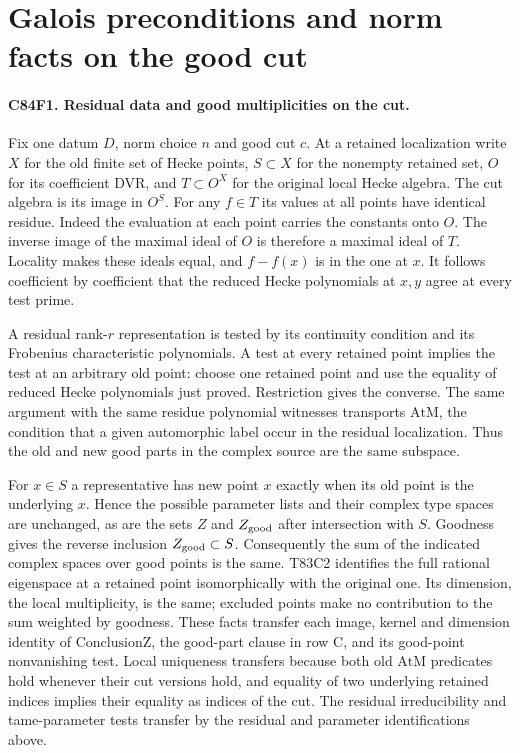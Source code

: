 \section{Galois preconditions and norm facts on the good cut}

\paragraph{C84F1. Residual data and good multiplicities on the cut.}
Fix one datum $D$, norm choice $n$ and good cut $c$. At a retained
localization write $X$ for the old finite set of Hecke points,
$S\subset X$ for the nonempty retained set, $O$ for its coefficient
DVR, and $T\subset O^X$ for the original local Hecke algebra.
The cut algebra is its image in $O^S$. For any $f\in T$ its values
at all points have identical residue. Indeed the evaluation at
each point carries the constants onto $O$. The inverse image of
the maximal ideal of $O$ is therefore a maximal ideal of $T$.
Locality makes these ideals equal, and $f-f(x)$ is in the one at
$x$. It follows coefficient by coefficient that the reduced Hecke
polynomials at $x,y$ agree at every test prime.

A residual rank-$r$ representation is tested by its continuity
condition and its Frobenius characteristic polynomials. A test at
every retained point implies the test at an arbitrary old point:
choose one retained point and use the equality of reduced Hecke
polynomials just proved. Restriction gives the converse. The same
argument with the same residue polynomial witnesses transports
$\mathrm{AtM}$, the condition that a given automorphic label occur
in the residual localization. Thus the old and new good parts in
the complex source are the same subspace.

For $x\in S$ a representative has new point $x$ exactly when its
old point is the underlying $x$. Hence the possible parameter
lists and their complex type spaces are unchanged, as are the
sets $Z$ and $Z_{\rm good}$ after intersection with $S$.
Goodness gives the reverse inclusion $Z_{\rm good}\subset S$.
Consequently the sum of the indicated complex spaces over good
points is the same. T83C2 identifies the full rational eigenspace
at a retained point isomorphically with the original one. Its
dimension, the local multiplicity, is the same; excluded points
make no contribution to the sum weighted by goodness. These
facts transfer each image, kernel and dimension identity of
$\mathrm{ConclusionZ}$, the good-part clause in row C, and its
good-point nonvanishing test. Local uniqueness transfers because
both old $\mathrm{AtM}$ predicates hold whenever their cut versions
hold, and equality of two underlying retained indices implies
their equality as indices of the cut. The residual irreducibility
and tame-parameter tests transfer by the residual and parameter
identifications above.

